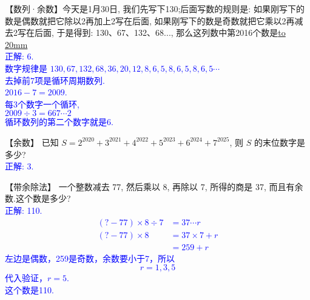 \item {
    【数列·余数】今天是1月30日, 我们先写下130;后面写数的规则是: 如果刚写下的数是偶数就把它除以2再加上2写在后面, 如果刚写下的数是奇数就把它乘以2再减去2写在后面, 于是得到: 130、67、132、68..., 那么这列数中第2016个数是\underline{\hbox to 20mm{}}
    \ifshowSolution
        \\\fangsong{}\textcolor{blue}{
            正解: 6.\\
            数字规律是 $130,67,132,68,36,20,12,8,6,5,8,6,5,8,6,5\cdots$\\
            去掉前7项是循环周期数列.\\
            $2016-7=2009$.\\
            每3个数字一个循环,\\
            $ 2009\div 3 = 667\cdots 2$\\
            循环数列的第二个数字就是6.
        }
    \else
        \vspace{1cm}
    \fi
}

\item {
    【余数】
    已知 $S = 2^{2020} + 3^{2021} + 4^{2022} + 5^{2023} +6^{2024} + 7^{2025}$, 则 $S$ 的末位数字是多少? 
    \ifshowSolution
        \\\fangsong{}\textcolor{blue}{
            正解: 3.
        }
    \else
        \vspace{1cm}
    \fi
}

\item {
    【带余除法】
    一个整数减去 77, 然后乘以 8, 再除以 7, 所得的商是 37, 而且有余数.这个数是多少? 
    \ifshowSolution
        \\\fangsong{}\textcolor{blue}{
            正解: 110.
            \begin{align*}
                (?-77)\times 8\div 7 &= 37\cdots r\\
                (?-77)\times 8 &= 37\times 7 + r\\
                &= 259 + r
            \end{align*}
            左边是偶数，259是奇数，余数要小于7，所以 
            \[ r = 1,3,5\]
            代入验证，$r=5$.\\
            这个数是110.
        }
    \else
        \vspace{1cm}
    \fi
}

